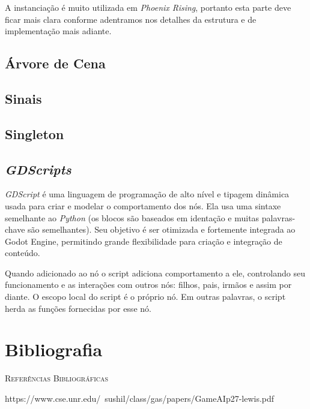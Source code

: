 A instanciação é muito utilizada em \textit{Phoenix Rising}, portanto esta
parte deve ficar mais clara conforme adentramos nos detalhes da estrutura e
de implementação mais adiante.

\subsection{Árvore de Cena}
\subsection{Sinais}
\subsection{Singleton}
\subsection{\textit{GDScripts}}

\textit{GDScript} é uma linguagem de programação de alto nível e tipagem 
dinâmica usada para criar e modelar o comportamento dos nós.
Ela usa uma sintaxe semelhante ao \textit{Python} (os blocos são 
baseados em identação e muitas palavras-chave são semelhantes). 
Seu objetivo é ser otimizada e fortemente integrada ao Godot Engine, permitindo
grande flexibilidade para criação e integração de conteúdo.

Quando adicionado ao nó o script adiciona comportamento a ele, controlando seu
funcionamento e as interações com outros nós: filhos, pais, irmãos e assim por 
diante. O escopo local do script é o próprio nó. Em outras palavras, o script 
herda as funções fornecidas por esse nó.

\section{Bibliografia}

\textsc{Referências Bibliográficas} 

\textnormal{https://www.cse.unr.edu/~sushil/class/gas/papers/GameAIp27-lewis.pdf}
